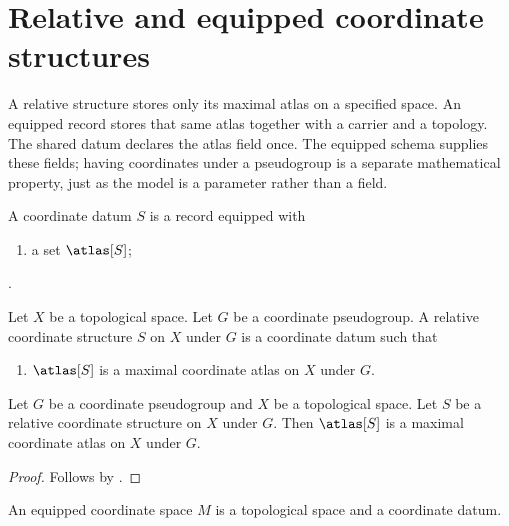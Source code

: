 \section{Relative and equipped coordinate structures}



A relative structure stores only its maximal atlas on a specified space.
An equipped record stores that same atlas together with a carrier and a
topology. The shared datum declares the atlas field once. The equipped schema
supplies these fields; having coordinates under a pseudogroup is a separate
mathematical property, just as the model is a parameter rather than a field.

\begin{struct}\label{coordinate_datum}
    A coordinate datum $S$ is a record equipped with
    \begin{enumerate}
        \item a set $\atlas[S]$;
    \end{enumerate}.
\end{struct}

\begin{struct}\label{relative_coordinate_structure}
    Let $X$ be a topological space.
    Let $G$ be a coordinate pseudogroup.
    A relative coordinate structure $S$ on $X$ under $G$ is a coordinate datum
    such that
    \begin{enumerate}
        \item\label{relative_atlas_maximal}
            $\atlas[S]$ is a maximal coordinate atlas on $X$ under $G$.
    \end{enumerate}
\end{struct}

\begin{classification}\label{relative_atlas_is_maximal}
    Let $G$ be a coordinate pseudogroup and $X$ be a topological space.
    Let $S$ be a relative coordinate structure on $X$ under $G$.
    Then $\atlas[S]$ is a maximal coordinate atlas on $X$ under $G$.
\end{classification}
\begin{proof}
    Follows by .
\end{proof}

\begin{struct}\label{equipped_coordinate_space}
    An equipped coordinate space $M$ is a topological space and a coordinate datum.
\end{struct}

